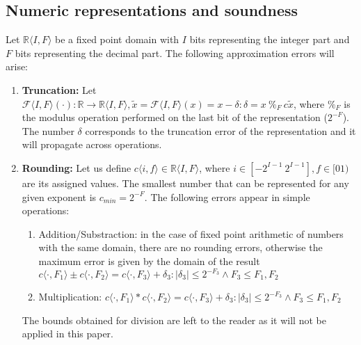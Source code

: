 \documentclass[runningheads,a4paper]{llncs}
\begin{document}
\subsection{Numeric representations and soundness} 
\label{sec:numeric_rep}

Let $\mathbb{R} \langle I,F \rangle$ be a fixed point domain with $I$ bits representing the integer part and $F$ bits
representing the decimal part. 
The following approximation errors will arise:
\begin{enumerate}
\item {\bf Truncation:}
Let $\mathcal{F}\langle I,F \rangle(\cdot) : \mathbb{R} \rightarrow \mathbb{R}\langle I,F \rangle, \tilde x=\mathcal{F}\langle I,F \rangle(x) = x-\delta : \delta=x\ \%_F\  c\tilde x$, where $\%_F$ is the modulus operation performed on the last bit of the representation ($2^{-F}$).
The number $\delta$ corresponds to the truncation error of the representation and it will propagate across operations.
\item {\bf Rounding:}
Let us define $c\langle i,f \rangle \in \mathbb{R}\langle I,F\rangle$, where $i \in [-2^{I-1}\ 2^{I-1}],f \in [0 1)$ are its assigned values. The smallest number that can be represented for any given exponent is $c_{min}=2^{-F}$.
The following errors appear in simple operations:
\begin{enumerate}
\item Addition/Substraction: in the case of fixed point arithmetic of numbers with the same domain, there are no rounding errors, otherwise the maximum error is given by the domain of the result $c\langle \cdot, F_1\rangle \pm c\langle \cdot , F_2\rangle= c\langle \cdot , F_3\rangle + \delta_3 :|\delta_3| \leq 2^{-F_3} \wedge F_3 \leq F_1,F_2$ 
\item Multiplication: $c\langle \cdot, F_1\rangle * c\langle \cdot,F_2\rangle=c\langle \cdot,F_3\rangle + \delta_3 : |\delta_3| \leq 2^{-F_3} \wedge F_3 \leq F_1,F_2$ 
\end{enumerate}
The bounds obtained for division are left to the reader as it will not be applied in this paper.


\end{enumerate}
\end{document}
